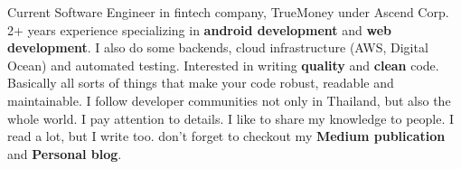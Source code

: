 

\begin{cvparagraph}

Current Software Engineer in fintech company, TrueMoney under Ascend Corp. 2+ years experience specializing in \textbf{android development} and \textbf{web development}. I also do some backends, cloud infrastructure (AWS, Digital Ocean) and automated testing. Interested in writing \textbf{quality} and \textbf{clean} code. Basically all sorts of things that make your code robust, readable and maintainable. I follow developer communities not only in Thailand, but also the whole world. I pay attention to details. I like to share my knowledge to people. I read a lot, but I write too. don't forget to checkout my \textbf{Medium publication} and \textbf{Personal blog}.
\end{cvparagraph}
